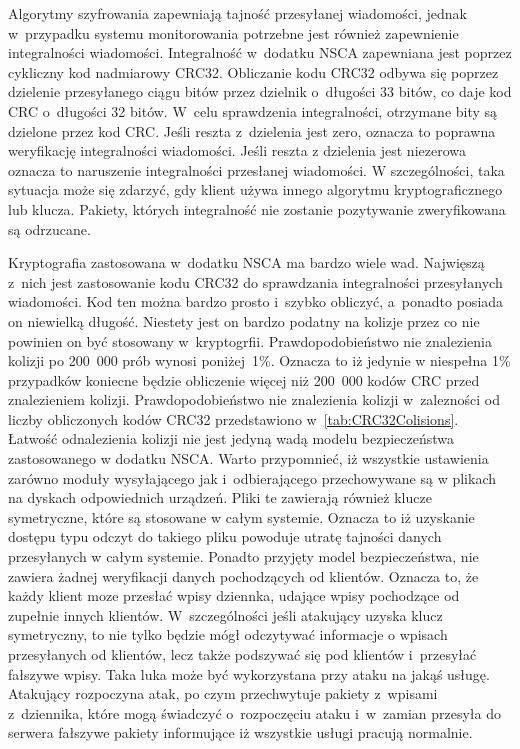 Algorytmy szyfrowania zapewniają tajność przesyłanej wiadomości,
jednak w~przypadku systemu monitorowania potrzebne jest również
zapewnienie integralności wiadomości. Integralność w~dodatku NSCA
zapewniana jest poprzez cykliczny kod nadmiarowy CRC32. Obliczanie
kodu CRC32 odbywa się poprzez dzielenie przesyłanego ciągu bitów przez
dzielnik o~długości 33 bitów, co daje kod CRC o~długości 32
bitów. W~celu sprawdzenia integralności, otrzymane bity są dzielone
przez kod CRC. Jeśli reszta z~dzielenia jest zero, oznacza to poprawna
weryfikację integralności wiadomości. Jeśli reszta z dzielenia jest
niezerowa oznacza to naruszenie integralności przesłanej wiadomości. W
szczególności, taka sytuacja może się zdarzyć, gdy klient używa innego
algorytmu kryptograficznego lub klucza. Pakiety, których integralność
nie zostanie pozytywanie zweryfikowana są odrzucane.

Kryptografia zastosowana w~dodatku NSCA ma bardzo wiele wad. Najwięszą
z~nich jest zastosowanie kodu CRC32 do sprawdzania integralności
przesyłanych wiadomości. Kod ten można bardzo prosto i~szybko
obliczyć, a~ponadto posiada on niewielką długość. Niestety jest on
bardzo podatny na kolizje przez co nie powinien on być stosowany
w~kryptogrfii. Prawdopodobieństwo nie znalezienia kolizji po 200~000
prób wynosi poniżej~1\%. Oznacza to iż jedynie w niespełna 1\%
przypadków koniecne będzie obliczenie więcej niż 200~000 kodów CRC
przed znalezieniem kolizji. Prawdopodobieństwo nie znalezienia kolizji
w~zalezności od liczby obliczonych kodów CRC32 przedstawiono
w~\ref{tab:CRC32Colisions}. Łatwość odnalezienia kolizji nie jest
jedyną wadą modelu bezpieczeństwa zastosowanego w dodatku NSCA. Warto
przypomnieć, iż wszystkie ustawienia zarówno moduły wysyłającego jak
i~odbierającego przechowywane są w plikach na dyskach odpowiednich
urządzeń. Pliki te zawierają również klucze symetryczne, które są
stosowane w całym systemie. Oznacza to iż uzyskanie dostępu typu
odczyt do takiego pliku powoduje utratę tajności danych przesyłanych w
całym systemie. Ponadto przyjęty model bezpieczeństwa, nie zawiera
żadnej weryfikacji danych pochodzących od klientów. Oznacza to, że
każdy klient moze przesłać wpisy dziennka, udające wpisy pochodzące od
zupełnie innych klientów. W~szczególności jeśli atakujący uzyska klucz
symetryczny, to nie tylko będzie mógł odczytywać informacje o wpisach
przesyłanych od klientów, lecz także podszywać się pod klientów
i~przesyłać fałszywe wpisy. Taka luka może być wykorzystana przy ataku
na jakąś usługę. Atakujący rozpoczyna atak, po czym przechwytuje
pakiety z~wpisami z~dziennika, które mogą świadczyć o~rozpoczęciu
ataku i~w~zamian przesyła do serwera fałszywe pakiety informujące iż
wszystkie usługi pracują normalnie.

